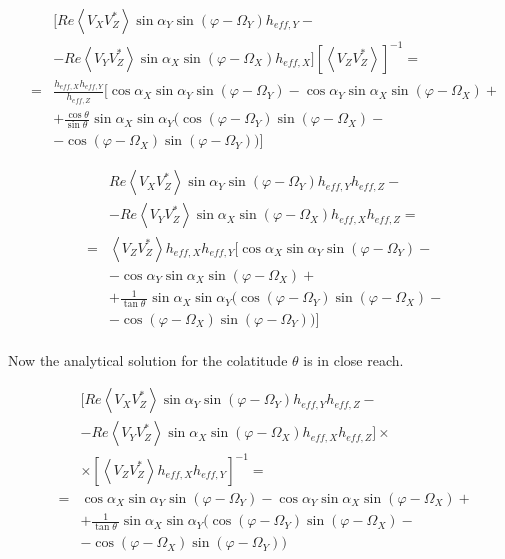 \documentclass[a4paper,10pt]{thesis}
\begin{document}
\begin{eqnarray}
&&[Re \left\langle V_X V_Z^{*}\right\rangle \sin \alpha_Y  \sin (\varphi - \Omega_Y) h_{eff,Y}-\nonumber \\
&&-Re \left\langle V_Y V_Z^{*}\right\rangle\sin \alpha_X  \sin (\varphi - \Omega_X) h_{eff,X}] \left[ \left\langle V_Z V_Z^{*} \right\rangle \right] ^{-1}= \nonumber \\
&=& \frac{  h_{eff,X} h_{eff,Y}}{ h_{eff,Z}} [\cos \alpha_X  \sin \alpha_Y  \sin (\varphi - \Omega_Y)- \cos \alpha_Y \sin \alpha_X  \sin (\varphi - \Omega_X) +\nonumber \\
&&+  \frac{\cos \theta}{\sin \theta\ } \sin \alpha_X  \sin \alpha_Y ( \cos (\varphi - \Omega_Y)  \sin (\varphi - \Omega_X)-\nonumber \\
&&- \cos (\varphi - \Omega_X)  \sin (\varphi - \Omega_Y)) ]
\end{eqnarray}

\begin{eqnarray}
&&Re \left\langle V_X V_Z^{*}\right\rangle \sin \alpha_Y  \sin (\varphi - \Omega_Y) h_{eff,Y}h_{eff,Z}-\nonumber \\
&&-Re \left\langle V_Y V_Z^{*}\right\rangle\sin \alpha_X  \sin (\varphi - \Omega_X) h_{eff,X}h_{eff,Z}= \nonumber \\
&=&\left\langle V_Z V_Z^{*} \right\rangle h_{eff,X} h_{eff,Y} [\cos \alpha_X  \sin \alpha_Y  \sin (\varphi - \Omega_Y)- \nonumber \\
&&- \cos \alpha_Y \sin \alpha_X  \sin (\varphi - \Omega_X) + \nonumber \\
&&+  \frac{1}{\tan \theta\ } \sin \alpha_X  \sin \alpha_Y ( \cos (\varphi - \Omega_Y)  \sin (\varphi - \Omega_X)- \nonumber \\
&&-\cos (\varphi - \Omega_X)  \sin (\varphi - \Omega_Y)) ]
\end{eqnarray}

\paragraph*{}
Now the analytical solution for the colatitude $\theta$  is in close reach.

\begin{eqnarray}
&&[Re \left\langle V_X V_Z^{*}\right\rangle \sin \alpha_Y  \sin (\varphi - \Omega_Y) h_{eff,Y}h_{eff,Z}-\nonumber \\
&&-Re \left\langle V_Y V_Z^{*}\right\rangle\sin \alpha_X  \sin (\varphi - \Omega_X) h_{eff,X}h_{eff,Z}]\times \nonumber \\
&& \times \left[ \left\langle V_Z V_Z^{*} \right\rangle h_{eff,X} h_{eff,Y} \right]^{-1} =\nonumber \\
&=& \cos \alpha_X  \sin \alpha_Y  \sin (\varphi - \Omega_Y)-  \cos \alpha_Y \sin \alpha_X  \sin (\varphi - \Omega_X) +\nonumber \\
&&+  \frac{1}{\tan \theta\ } \sin \alpha_X  \sin \alpha_Y ( \cos (\varphi - \Omega_Y)  \sin (\varphi - \Omega_X)-\nonumber \\
&&- \cos (\varphi - \Omega_X)  \sin (\varphi - \Omega_Y))
\end{eqnarray}
\end{document}
